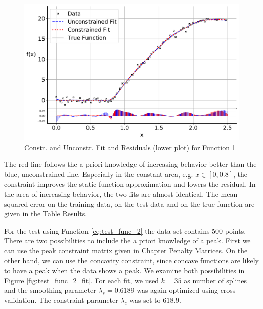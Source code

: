 \documentclass[10pt,a4paper]{article}
\begin{document}
\begin{figure}[H]
	\centering
	\includegraphics[width=\columnwidth]{../thesisplots/exp_inc1_fit.pdf}
	\caption{Constr. and Unconstr. Fit and Residuals (lower plot) for Function 1}
	\label{fig:test_func_1_fit}
\end{figure}

The red line follows the a priori knowledge of increasing behavior better than the blue, unconstrained line. Especially in the constant area, e.g. $x \in  [0, 0.8]$, the constraint improves the static function approximation and lowers the residual. In the area of increasing behavior, the two fits are almost identical. The mean squared error on the training data, on the test data and on the true function are given in the Table Results.

For the test using Function \ref{eq:test_func_2} the data set contains 500 points. There are two possibilities to include the a priori knowledge of a peak. First we can use the peak constraint matrix given in Chapter Penalty Matrices. On the other hand, we can use the concavity constraint, since concave functions are likely to have a peak when the data shows a peak. We examine both possibilities in Figure \ref{fig:test_func_2_fit}. For each fit, we used $k=35$ as number of splines and the smoothing parameter $\lambda_s=0.6189$ was again optimized using cross-validation. The constraint parameter $\lambda_c$ was set to $618.9$.
\end{document}
